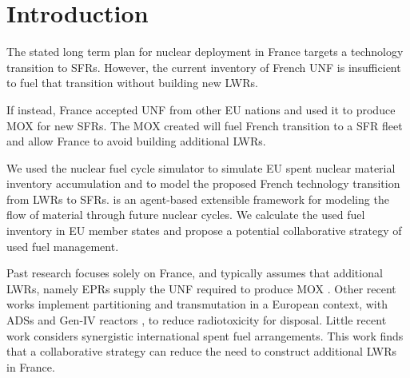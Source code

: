 
\section{Introduction}
The stated long term plan for nuclear deployment in France targets a technology 
transition to \glspl{SFR}. However, the current inventory of French \gls{UNF} 
is insufficient to fuel that transition without building new \glspl{LWR}.

If instead, France accepted 
\gls{UNF} from other \gls{EU} nations and used it to produce \gls{MOX} for new \glspl{SFR}.
The \gls{MOX} created will fuel French transition to a \gls{SFR} fleet
and allow France to avoid building additional \glspl{LWR}.


We used the \Cyclus nuclear fuel cycle simulator \cite{huff_fundamental_2016} to simulate
 \gls{EU} spent nuclear material inventory accumulation and to model the 
 proposed French 
 technology transition from \glspl{LWR} to
 \glspl{SFR}. \Cyclus is an agent-based extensible
framework for modeling the flow of material through future nuclear cycles.
We calculate the used fuel
inventory in \gls{EU} member states and propose a potential collaborative
strategy of used fuel management.


Past research focuses solely on France, and typically assumes that additional \glspl{LWR},
namely \glspl{EPR} supply the \gls{UNF} required to produce \gls{MOX} \cite{carre_overview_2009, martin_symbiotic_2017, freynet_multiobjective_2016}.
Other recent works implement partitioning and transmutation
in a European context, with \glspl{ADS} and Gen-IV reactors \cite{fazio_study_2013},
to reduce radiotoxicity for disposal.
Little recent work considers synergistic international spent fuel arrangements.
This work finds that a collaborative strategy can reduce the
need to construct additional \glspl{LWR} in France.
